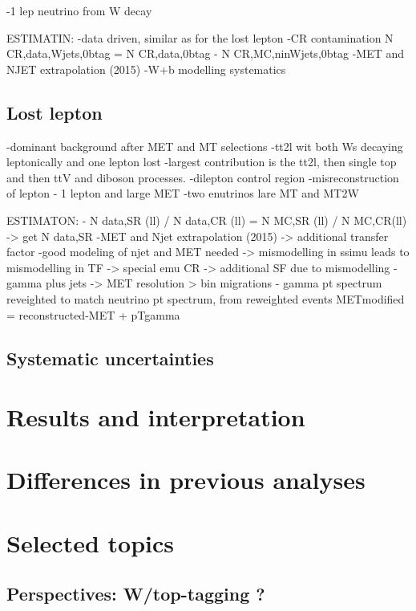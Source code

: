 -1 lep neutrino from W decay

ESTIMATIN:
-data driven, similar as for the lost lepton
-CR contamination N CR,data,Wjets,0btag = N CR,data,0btag - N CR,MC,ninWjets,0btag
-MET and NJET extrapolation (2015)
-W+b modelling systematics

\subsection{Lost lepton}

-dominant background after MET and MT selections
-tt2l wit both Ws decaying leptonically and one lepton lost
-largest contribution is the tt2l, then single top and then ttV and diboson processes.
-dilepton control region
-misreconstruction of lepton - 1 lepton and large MET
-two enutrinos lare MT and MT2W

ESTIMATON:
- N data,SR (ll) / N data,CR (ll) = N MC,SR (ll) / N MC,CR(ll) -> get N data,SR
-MET and Njet extrapolation (2015) -> additional transfer factor
-good modeling of njet and MET needed -> mismodelling in ssimu leads to mismodelling in TF -> special emu CR -> additional SF due to mismodelling
-gamma plus jets -> MET resolution > bin migrations - gamma pt spectrum reveighted to match neutrino pt spectrum, from reweighted events METmodified = reconstructed-MET + pTgamma


\subsection{Systematic uncertainties}

\section{Results and interpretation}

\section{Differences in previous analyses}

\section{Selected topics}

\subsection{Perspectives: W/top-tagging ?}

